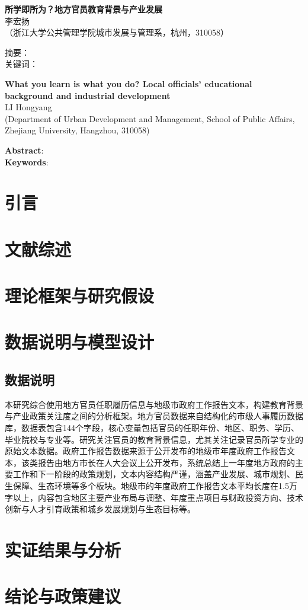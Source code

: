 \documentclass[a4paper,11pt, fontset=fandol]{ctexart}
\newcommand*{\TNR}{\CJKfamily{TNR}}
\newcommand{\sanhao}{\fontsize{15.75pt}{\baselineskip}\selectfont}
\newcommand{\sihao}{\fontsize{14pt}{\baselineskip}\selectfont}
\newcommand{\wuhao}{\fontsize{10.5pt}{\baselineskip}\selectfont}
\begin{document}
\begin{center}
\textbf{\sanhao 所学即所为？地方官员教育背景与产业发展} \\
\kaishu \wuhao 李宏扬 \\
\songti （浙江大学公共管理学院城市发展与管理系，杭州，310058）\\
\end{center}
\heiti \noindent 摘要： \songti \\
\heiti \noindent 关键词：\songti 


\begin{center}
\textbf{\TNR\sihao What you learn is what you do? Local officials' educational background and industrial development} \\
\wuhao LI Hongyang \\
(Department of Urban Development and Management, School of Public Affairs, Zhejiang University, Hangzhou, 310058) 
\end{center}
\noindent \textbf{Abstract}: \\
\noindent \textbf{Keywords}: 

\newpage
\tableofcontents
\newpage
\songti

\section{引言}

\section{文献综述}

\section{理论框架与研究假设}

\section{数据说明与模型设计}
\subsection{数据说明}
本研究综合使用地方官员任职履历信息与地级市政府工作报告文本，构建教育背景与产业政策关注度之间的分析框架。地方官员数据来自结构化的市级人事履历数据库，数据表包含144个字段，核心变量包括官员的任职年份、地区、职务、学历、毕业院校与专业等。研究关注官员的教育背景信息，尤其关注记录官员所学专业的原始文本数据。政府工作报告数据来源于公开发布的地级市年度政府工作报告文本，该类报告由地方市长在人大会议上公开发布，系统总结上一年度地方政府的主要工作和下一阶段的政策规划，文本内容结构严谨，涵盖产业发展、城市规划、民生保障、生态环境等多个板块。地级市的年度政府工作报告文本平均长度在1.5万字以上，内容包含地区主要产业布局与调整、年度重点项目与财政投资方向、技术创新与人才引育政策和城乡发展规划与生态目标等。


\section{实证结果与分析}

\section{结论与政策建议}
\end{document}
